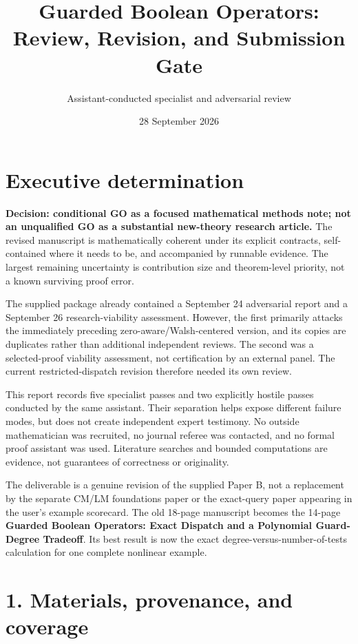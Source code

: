 \documentclass[
  11pt,
]{article}
\title{Guarded Boolean Operators: Review, Revision, and Submission Gate}
\author{Assistant-conducted specialist and adversarial review}
\date{28 September 2026}
\begin{document}
\maketitle

\section{Executive determination}\label{executive-determination}

\textbf{Decision: conditional GO as a focused mathematical methods note;
not an unqualified GO as a substantial new-theory research article.} The
revised manuscript is mathematically coherent under its explicit
contracts, self-contained where it needs to be, and accompanied by
runnable evidence. The largest remaining uncertainty is contribution
size and theorem-level priority, not a known surviving proof error.

The supplied package already contained a September 24 adversarial report
and a September 26 research-viability assessment. However, the first
primarily attacks the immediately preceding zero-aware/Walsh-centered
version, and its copies are duplicates rather than additional
independent reviews. The second was a selected-proof viability
assessment, not certification by an external panel. The current
restricted-dispatch revision therefore needed its own review.

This report records five specialist passes and two explicitly hostile
passes conducted by the same assistant. Their separation helps expose
different failure modes, but does not create independent expert
testimony. No outside mathematician was recruited, no journal referee
was contacted, and no formal proof assistant was used. Literature
searches and bounded computations are evidence, not guarantees of
correctness or originality.

The deliverable is a genuine revision of the supplied Paper B, not a
replacement by the separate CM/LM foundations paper or the exact-query
paper appearing in the user's example scorecard. The old 18-page
manuscript becomes the 14-page \textbf{Guarded Boolean Operators: Exact
Dispatch and a Polynomial Guard-Degree Tradeoff}. Its best result is now
the exact degree-versus-number-of-tests calculation for one complete
nonlinear example.

\section{1. Materials, provenance, and
coverage}\label{materials-provenance-and-coverage}
\end{document}
